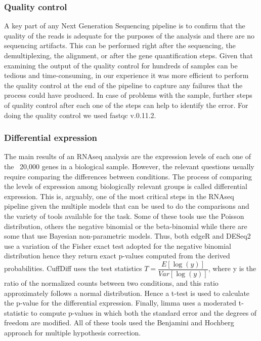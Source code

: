 \subsubsection{Quality control}
A key part of any Next Generation Sequencing pipeline is to confirm that the quality of the reads is adequate for the purposes of the analysis and there are no sequencing artifacts. This can be performed right after the sequencing, the demultiplexing, the alignment, or after the gene quantification steps. Given that examining the output of the quality control for hundreds of samples can be tedious and time-consuming, in our experience it was more efficient to perform the quality control at the end of the pipeline to capture any failures that the process could have produced. In case of problems with the sample, further steps of quality control after each one of the steps can help to identify the error. For doing the quality control we used fastqc v.0.11.2.

\subsubsection{Differential expression}
The main results of an RNAseq analysis are the expression levels of each one of the ~20,000 genes in a biological sample. However, the relevant questions usually require comparing the differences between conditions. The process of comparing the levels of expression among biologically relevant groups is called differential expression. This is, arguably, one of the most critical steps in the RNAseq pipeline given the multiple models that can be used to do the comparisons and the variety of tools available for the task. Some of these tools use the Poisson distribution, others the negative binomial or the beta-binomial while there are some that use Bayesian non-parametric models. Thus, both edgeR and DESeq2 use a variation of the Fisher exact test adopted for the negative binomial distribution hence they return exact p-values computed from the derived probabilities. CuffDiff uses the test statistics $T=\dfrac{E[\log(y)]}{Var[\log(y)]}$, where y is the ratio of the normalized counts between two conditions, and this ratio approximately follows a normal distribution. Hence a t-test is used to calculate the p-value for the differential expression. Finally, limma uses a moderated t-statistic to compute p-values in which both the standard error and the degrees of freedom are modified. All of these tools used the Benjamini and Hochberg approach for multiple hypothesis correction.\cite{Benjamini1995}

